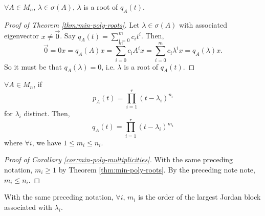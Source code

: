 \begin{theorem}
\label{thm:min-poly-roots}
$\forall A \in M_n$, $\lambda \in \sigma(A)$, $\lambda$ is a root of $q_A(t)$.
\end{theorem}

\begin{proof}[Proof of Theorem \ref{thm:min-poly-roots}]
Let $\lambda \in \sigma(A)$ with associated eigenvector $x \not=\Vec{0}$. Say $q_A(t) = \sum_{i=0}^m c_it^i$. Then,
$$
\Vec{0} = 0x = q_A(A)x = \sum_{i=0}^m c_iA^ix = \sum_{i=0}^m c_i \lambda^i x = q_A(\lambda) x.
$$
So it must be that $q_A(\lambda) = 0$, i.e. $\lambda$ is a root of $q_A(t)$.
\end{proof}

\begin{corollary}
\label{cor:min-poly-multiplicities}
$\forall A \in M_n$, if
$$
p_A(t) = \prod_{i=1}^r(t-\lambda_i)^{n_i}
$$
for $\lambda_i$ distinct. Then,
$$
q_A(t) = \prod_{i=1}^r (t-\lambda_i)^{m_i}
$$
where $\forall i$, we have $1 \leq m_i \leq n_i$.
\end{corollary}
\begin{proof}[Proof of Corollary \ref{cor:min-poly-multiplicities}]
With the same preceding notation, $m_i \geq 1$ by Theorem \ref{thm:min-poly-roots}. By the preceding note note, $m_i \leq n_i$.
\end{proof}

\begin{theorem}
\label{thm:order-Jordan-block}
With the same preceding notation, $\forall i$, $m_i$ is the order of the largest Jordan block associated with $\lambda_i$.
\end{theorem}

